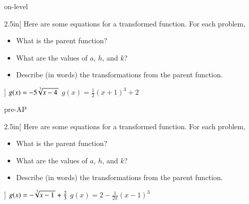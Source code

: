 \begin{taggedblock}{on-level}

    \begin{my2Problems}[\large]{2.5in}[%
        Here are some equations for a transformed function.
        For each problem,
        \vspace{-1em}
        \begin{itemize}[nosep]
            \item What is the parent function?
            \item What are the values of $a$, $h$, and $k$?
            \item Describe (in words) the transformations from the parent function.
        \end{itemize}
        ]
        {
            $g(x) = -5\myRoot[3]{x-4} $
        }
        {
            $g(x) = \frac{1}{2} (x+1)^3 + 2$
        }
    \end{my2Problems}
\end{taggedblock}




\begin{taggedblock}{pre-AP}
    \begin{my2Problems}[\large]{2.5in}[%
        Here are some equations for a transformed function.
        For each problem,
        \vspace{-1em}
        \begin{itemize}[nosep]
            \item What is the parent function?
            \item What are the values of $a$, $h$, and $k$?
            \item Describe (in words) the transformations from the parent function.
        \end{itemize}
        ]
        {
            $g(x) = -\myRoot[3]{x-1} + \frac{2}{3}$
        }
        {
            $g(x) = 2 - \frac{1}{2\pi} (x-1)^3 $
        }
    \end{my2Problems}
\end{taggedblock}

